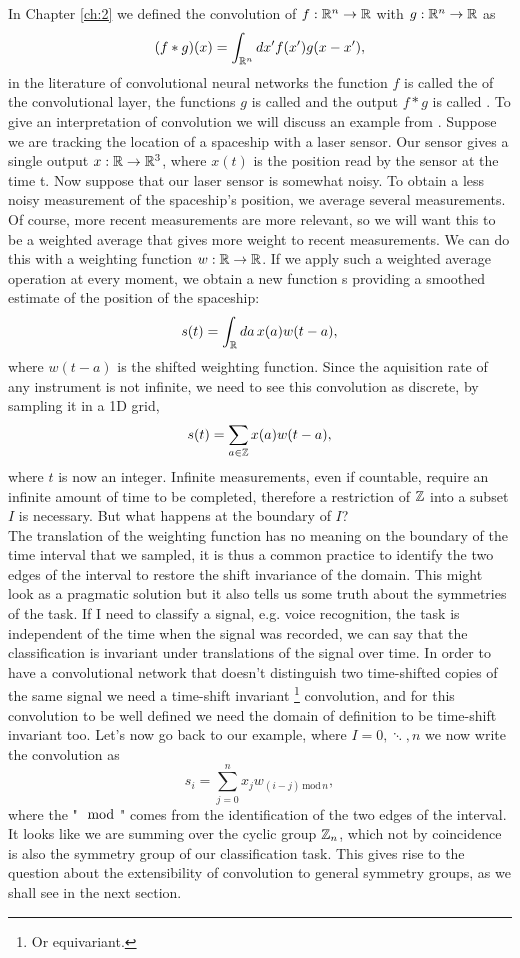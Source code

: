 \documentclass[../3.tex]{subfiles}
\begin{document}
    In Chapter \ref{ch:2} we defined the convolution of $f:\mathbb{R}^n \to \mathbb{R}$ with $g:\mathbb{R}^n \to \mathbb{R}$ as
    \[ (f * g)(x) = \int_{\mathbb{R}^n} dx' f(x')g(x-x'), \]
    in the literature of convolutional neural networks the function $f$ is called the  of the
    convolutional layer, the functions $g$ is called  and the output $f*g$ is called .
    To give an interpretation of convolution we will discuss an example from \cite{deep}.
    Suppose we are tracking the location of a spaceship with a laser sensor. Our
    sensor gives a single output $x : \mathbb{R} \to \mathbb{R}^3$, where $x(t)$ is the position read by the sensor at the time t.
    Now suppose that our laser sensor is somewhat noisy. To obtain a less noisy
    measurement of the spaceship’s position, we average several measurements.
    Of course, more recent measurements are more relevant, so we will want this to
    be a weighted average that gives more weight to recent measurements. We can
    do this with a weighting function $w:\mathbb{R} \to \mathbb{R}$. If
    we apply such a weighted average operation at every moment, we obtain a new
    function s providing a smoothed estimate of the position of the spaceship:
    \[ s(t) = \int_{\mathbb{R}} da \, x(a)w(t-a), \]
    where $w(t-a)$ is the shifted weighting function.
    Since the aquisition rate of any instrument is not infinite, we need to see this convolution as discrete, by sampling it in a 1D grid,
    \[ s(t) = \sum_{a \in \mathbb{Z}} x(a)w(t-a), \]
    where $t$ is now an integer.
    Infinite measurements, even if countable, require an infinite amount of time to be completed, therefore a restriction of $\mathbb{Z}$
    into a subset $I$ is necessary. But what happens at the boundary of $I$?\\
    The translation of the weighting function has no meaning on the boundary of the time interval that we sampled, it is thus 
    a common practice to identify the two edges of the interval to restore the shift invariance of the domain.
    This might look as a pragmatic solution but it also tells us some truth about the symmetries of the task.
    If I need to classify a signal, e.g. voice recognition, the task is independent of the time when the signal was recorded,
    we can say that the classification is invariant under translations of the signal over time. In order to have a convolutional network that
    doesn't distinguish two time-shifted copies of the same signal we need a time-shift invariant \footnote{ Or equivariant.} convolution, and for this
    convolution to be well defined we need the domain of definition to be time-shift invariant too.
    Let's now go back to our example, where $I = {0,\ddots, n}$ we now write the convolution as
    \[ s_i = \sum_{j = 0}^n x_j w_{(i-j) \, \text{mod} \, n},\]
    where the "$\mod$" comes from the identification of the two edges of the interval.
    It looks like we are summing over the cyclic group $\mathbb{Z}_n$, which not by coincidence is also the symmetry group of our classification task.
    This gives rise to the question about the extensibility of convolution to general symmetry groups, as we shall see in the next section.
\end{document}
